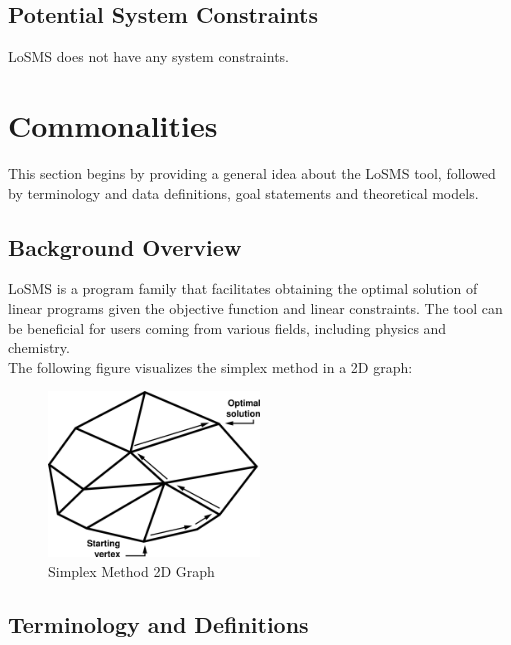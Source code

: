 \documentclass[12pt]{article}
\newcommand{\famname}{LoSMS} %
\begin{document}
\subsection{Potential System Constraints}

\famname{} does not have any system constraints.

\section{Commonalities} \label{Sec_Commonalities}

This section begins by providing a general idea about the \famname{} tool, 
followed by terminology and data definitions, goal statements and theoretical 
models.

\subsection{Background Overview} \label{Sec_Background}

\famname{} is a program family that facilitates obtaining the optimal solution 
of linear programs given the objective function and linear constraints. The 
tool can be beneficial for users coming from various fields, including physics 
and chemistry. \\

The following figure visualizes the simplex method in a 2D graph:

\begin{figure}[H]
	\centering
	\includegraphics[width=0.5\textwidth]{Simplex-description-en.png}
	\caption{Simplex Method 2D Graph}
	\label{FigSimplex}
\end{figure}


\subsection{Terminology and  Definitions}
\end{document}
